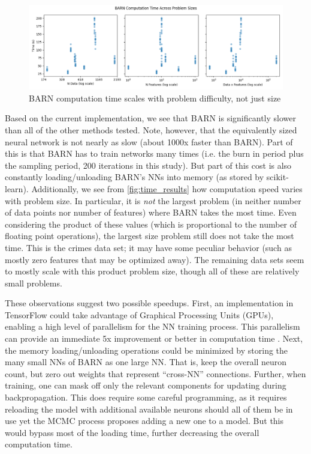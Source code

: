 \documentclass[12pt]{article}
\begin{document}
\begin{figure}[ht]
\centering
    \includegraphics[scale=.5]{figs/time_results.png}
    \caption{BARN computation time scales with problem difficulty, not just size}
    \label{fig:time_results}
\end{figure}

Based on the current implementation, we see that BARN is significantly slower than all of the other methods tested.  Note, however, that the equivalently sized neural network is not nearly as slow (about 1000x faster than BARN).  Part of this is that BARN has to train networks many times (i.e. the burn in period plus the sampling period, 200 iterations in this study).  But part of this cost is also constantly loading/unloading BARN's NNs into memory (as stored by scikit-learn).  Additionally, we see from \autoref{fig:time_results} how computation speed varies with problem size.  In particular, it is \emph{not} the largest problem (in neither number of data points nor number of features) where BARN takes the most time.  Even considering the product of these values (which is proportional to the number of floating point operations), the largest size problem still does not take the most time.  This is the crimes data set; it may have some peculiar behavior (such as mostly zero features that may be optimized away).  The remaining data sets seem to mostly scale with this product problem size, though all of these are relatively small problems.

These observations suggest two possible speedups.  First, an implementation in TensorFlow could take advantage of Graphical Processing Units (GPUs), enabling a high level of parallelism for the NN training process.  This parallelism can provide an immediate 5x improvement or better in computation time \cite{lind2019performance}.  Next, the memory loading/unloading operations could be minimized by storing the many small NNs of BARN as one large NN.  That is, keep the overall neuron count, but zero out weights that represent ``cross-NN'' connections.  Further, when training, one can mask off only the relevant components for updating during backpropagation.  This does require some careful programming, as it requires reloading the model with additional available neurons should all of them be in use yet the MCMC process proposes adding a new one to a model.  But this would bypass most of the loading time, further decreasing the overall computation time.
\end{document}
